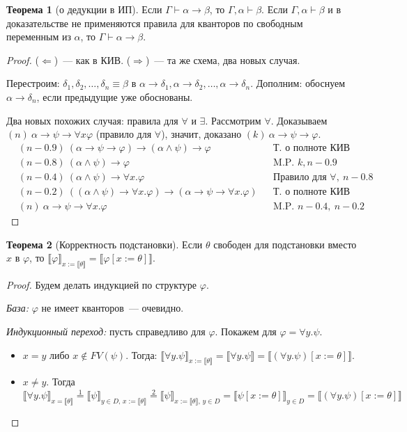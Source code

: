 \documentclass[a4paper,11pt]{article}
\theoremstyle{definition}
\newtheorem*{thm}{Теорема}
\newcommand{\proves}{\vdash}
\begin{document}
\begin{thm}[о дедукции в ИП]
Если $\Gamma \proves \alpha \to \beta$, то $\Gamma, \alpha \proves \beta$. Если
$\Gamma, \alpha \proves \beta$ и в доказательстве не применяются правила для
кванторов по свободным переменным из $\alpha$, то $\Gamma \proves \alpha \to
\beta$.
\end{thm}
\begin{proof}
($\Leftarrow$)~--- как в КИВ. ($\Rightarrow$)~--- та же схема, два новых случая.

Перестроим: $\delta_1, \delta_2, \dots, \delta_n \equiv \beta$ в $\alpha \to
\delta_1, \alpha \to \delta_2, \dots, \alpha \to \delta_n$. Дополним: обоснуем
$\alpha \to \delta_n$, если предыдущие уже обоснованы.

Два новых похожих случая: правила для $\forall$ и $\exists$. Рассмотрим
$\forall$. Доказываем $(n)\ \alpha \to \psi \to \forall x\varphi$ (правило для
$\forall$), значит, доказано $(k)\ \alpha \to \psi \to \varphi$.
\begin{align*}
&(n-0.9)\ (\alpha \to \psi \to \varphi) \to (\alpha \wedge \psi) \to \varphi &&\text{Т. о полноте КИВ}\\
&(n-0.8)\ (\alpha \wedge \psi) \to \varphi &&\text{M.P. } k, n-0.9\\
&(n-0.4)\ (\alpha \wedge \psi) \to \forall x.\varphi &&\text{Правило для } \forall,\ n-0.8\\
&(n-0.2)\ ((\alpha \wedge \psi) \to \forall x.\varphi) \to (\alpha \to \psi \to \forall x.\varphi) &&\text{Т. о полноте КИВ}\\
&(n)\ \alpha \to \psi \to \forall x.\varphi &&\text{M.P. } n-0.4,\ n-0.2
\end{align*}
\end{proof}

\begin{thm}[Корректность подстановки]
Если $\theta$ свободен для подстановки вместо $x$ в $\varphi$, то
$\llbracket\varphi\rrbracket_{x := \llbracket\theta\rrbracket} =
\llbracket\varphi[x := \theta]\rrbracket$.
\end{thm}
\begin{proof}
Будем делать индукцией по структуре $\varphi$.

\emph{База:} $\varphi$ не имеет кванторов~--- очевидно.

\emph{Индукционный переход:} пусть справедливо для $\varphi$. Покажем для
$\varphi = \forall y.\psi$.
\begin{itemize}
\item $x = y$ либо $x \notin FV(\psi)$. Тогда:
  $\llbracket\forall y.\psi\rrbracket_{x := \llbracket\theta\rrbracket} =
  \llbracket\forall y.\psi\rrbracket = \llbracket(\forall y.\psi)[x := \theta]\rrbracket$.
\item $x \ne y$. Тогда
  \[
  \llbracket\forall y.\psi\rrbracket_{x=\llbracket\theta\rrbracket}
  \overset{1}{=} \llbracket\psi\rrbracket_{y \in D,\, x := \llbracket\theta\rrbracket}
  \overset{2}{=} \llbracket\psi\rrbracket_{x := \llbracket\theta\rrbracket,\, y \in D}
  = \llbracket\psi[x := \theta]\rrbracket_{y \in D}
  = \llbracket(\forall y.\psi)[x := \theta]\rrbracket
  \]
\end{itemize}
\end{proof}
\end{document}
